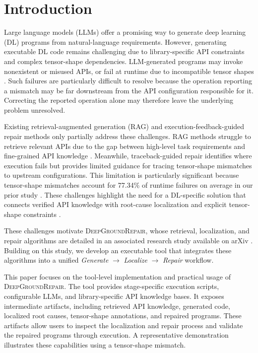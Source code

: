 \documentclass[10pt,conference]{IEEEtran}
\begin{document}
\section{Introduction}
Large language models (LLMs) offer a promising way to generate deep learning (DL) programs from natural-language requirements. However, generating executable DL code remains challenging due to library-specific API constraints and complex tensor-shape dependencies. LLM-generated programs may invoke nonexistent or misused APIs, or fail at runtime due to incompatible tensor shapes \cite{humbatova2020,wei2022dlapi}. Such failures are particularly difficult to resolve because the operation reporting a mismatch may be far downstream from the API configuration responsible for it. Correcting the reported operation alone may therefore leave the underlying problem unresolved.

Existing retrieval-augmented generation (RAG) and execution-feedback-guided repair methods only partially address these challenges. RAG methods struggle to retrieve relevant APIs due to the gap between high-level task requirements and fine-grained API knowledge \cite{rag,chen2025apidoc,jain2025apidoc,Whatretrieveeffectiveretrieval}. Meanwhile, traceback-guided repair identifies where execution fails but provides limited guidance for tracing tensor-shape mismatches to upstream configurations. This limitation is particularly significant because tensor-shape mismatches account for 77.34\% of runtime failures on average in our prior study \cite{DeepEval}. These challenges highlight the need for a DL-specific solution that connects verified API knowledge with root-cause localization and explicit tensor-shape constraints \cite{deng2024constraints}.

These challenges motivate \textsc{DeepGroundRepair}, whose retrieval, localization, and repair algorithms are detailed in an associated research study available on arXiv \cite{deepgroundrepair}. Building on this study, we develop an executable tool that integrates these algorithms into a unified \textit{Generate} $\rightarrow$ \textit{Localize} $\rightarrow$ \textit{Repair} workflow.

This paper focuses on the tool-level implementation and practical usage of \textsc{DeepGroundRepair}. The tool
provides stage-specific execution scripts, configurable LLMs, and library-specific API knowledge bases. It exposes intermediate artifacts, including retrieved API knowledge, generated code, localized root causes, tensor-shape annotations, and repaired programs. These artifacts allow users to inspect the localization and repair process and validate the repaired programs through execution. A representative demonstration illustrates these capabilities using a tensor-shape mismatch.
\end{document}
